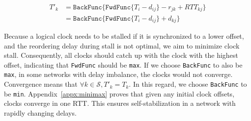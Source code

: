 \vspace{-1em}
\begin{equation*}
\begin{aligned}
T'_k & = \texttt{BackFunc} \{ \texttt{FwdFunc} \{ T_i - d_{ij} \} - r_{jk} + RTT_{kj} \} \\
     & = \texttt{BackFunc} \{ \texttt{FwdFunc} \{ T_i - d_{ij} \} + d_{kj} \}
\end{aligned}
\end{equation*}

Because a logical clock needs to be stalled if it is synchronized to a lower offset, and the reordering delay during stall is not optimal, we aim to minimize clock stall.
Consequently, all clocks should catch up with the clock with the highest offset, indicating that \texttt{FwdFunc} should be \texttt{max}.
If we choose \texttt{BackFunc} to also be \texttt{max}, in some networks with delay imbalance, the clocks would not converge.
Convergence means that $\forall k \in \mathcal{S}, T'_k = T_k$.
In this regard, we choose \texttt{BackFunc} to be \texttt{min}.
Appendix~\ref{appx:minimax} proves that given any initial clock offsets, clocks converge in one RTT.
This ensures self-stabilization in a network with rapidly changing delays.


